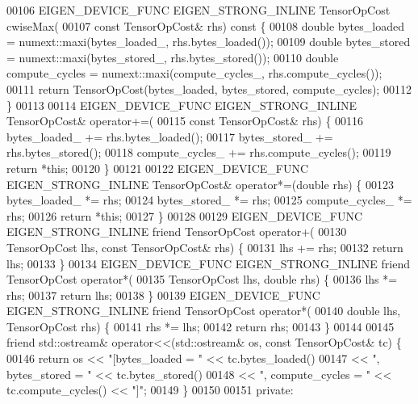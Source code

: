 \begin{DoxyCode}
00106   EIGEN\_DEVICE\_FUNC EIGEN\_STRONG\_INLINE TensorOpCost cwiseMax(
00107       \textcolor{keyword}{const} TensorOpCost& rhs)\textcolor{keyword}{ const }\{
00108     \textcolor{keywordtype}{double} bytes\_loaded = numext::maxi(bytes\_loaded\_, rhs.bytes\_loaded());
00109     \textcolor{keywordtype}{double} bytes\_stored = numext::maxi(bytes\_stored\_, rhs.bytes\_stored());
00110     \textcolor{keywordtype}{double} compute\_cycles = numext::maxi(compute\_cycles\_, rhs.compute\_cycles());
00111     \textcolor{keywordflow}{return} TensorOpCost(bytes\_loaded, bytes\_stored, compute\_cycles);
00112   \}
00113 
00114   EIGEN\_DEVICE\_FUNC EIGEN\_STRONG\_INLINE TensorOpCost& operator+=(
00115       \textcolor{keyword}{const} TensorOpCost& rhs) \{
00116     bytes\_loaded\_ += rhs.bytes\_loaded();
00117     bytes\_stored\_ += rhs.bytes\_stored();
00118     compute\_cycles\_ += rhs.compute\_cycles();
00119     \textcolor{keywordflow}{return} *\textcolor{keyword}{this};
00120   \}
00121 
00122   EIGEN\_DEVICE\_FUNC EIGEN\_STRONG\_INLINE TensorOpCost& operator*=(\textcolor{keywordtype}{double} rhs) \{
00123     bytes\_loaded\_ *= rhs;
00124     bytes\_stored\_ *= rhs;
00125     compute\_cycles\_ *= rhs;
00126     \textcolor{keywordflow}{return} *\textcolor{keyword}{this};
00127   \}
00128 
00129   EIGEN\_DEVICE\_FUNC EIGEN\_STRONG\_INLINE \textcolor{keyword}{friend} TensorOpCost operator+(
00130       TensorOpCost lhs, \textcolor{keyword}{const} TensorOpCost& rhs) \{
00131     lhs += rhs;
00132     \textcolor{keywordflow}{return} lhs;
00133   \}
00134   EIGEN\_DEVICE\_FUNC EIGEN\_STRONG\_INLINE \textcolor{keyword}{friend} TensorOpCost operator*(
00135       TensorOpCost lhs, \textcolor{keywordtype}{double} rhs) \{
00136     lhs *= rhs;
00137     \textcolor{keywordflow}{return} lhs;
00138   \}
00139   EIGEN\_DEVICE\_FUNC EIGEN\_STRONG\_INLINE \textcolor{keyword}{friend} TensorOpCost operator*(
00140       \textcolor{keywordtype}{double} lhs, TensorOpCost rhs) \{
00141     rhs *= lhs;
00142     \textcolor{keywordflow}{return} rhs;
00143   \}
00144 
00145   \textcolor{keyword}{friend} std::ostream& operator<<(std::ostream& os, \textcolor{keyword}{const} TensorOpCost& tc) \{
00146     \textcolor{keywordflow}{return} os << \textcolor{stringliteral}{"[bytes\_loaded = "} << tc.bytes\_loaded()
00147               << \textcolor{stringliteral}{", bytes\_stored = "} << tc.bytes\_stored()
00148               << \textcolor{stringliteral}{", compute\_cycles = "} << tc.compute\_cycles() << \textcolor{stringliteral}{"]"};
00149   \}
00150 
00151  \textcolor{keyword}{private}:

\end{DoxyCode}
